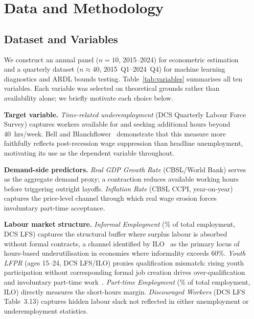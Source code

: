 \documentclass[sigconf]{acmart}
\begin{document}
\section{Data and Methodology}

\subsection{Dataset and Variables}

We construct an annual panel ($n{=}10$, 2015--2024) for econometric
estimation and a quarterly dataset ($n{\approx}40$, 2015~Q1--2024~Q4)
for machine learning diagnostics and ARDL bounds testing.
Table~\ref{tab:variables} summarises all ten variables. Each variable
was selected on theoretical grounds rather than availability alone; we
briefly motivate each choice below.

\textbf{Target variable.} \emph{Time-related underemployment} (DCS
Quarterly Labour Force Survey) captures workers available for and seeking
additional hours beyond 40~hrs/week. Bell and
Blanchflower~\cite{bell2018underemployment} demonstrate that this
measure more faithfully reflects post-recession wage suppression than
headline unemployment, motivating its use as the dependent variable
throughout.

\textbf{Demand-side predictors.} \emph{Real GDP Growth Rate}
(CBSL/World Bank) serves as the aggregate demand proxy; a contraction
reduces available working hours before triggering outright layoffs.
\emph{Inflation Rate} (CBSL CCPI, year-on-year) captures the
price-level channel through which real wage erosion forces
involuntary part-time acceptance.

\textbf{Labour market structure.} \emph{Informal Employment} (\% of
total employment, DCS LFS) captures the structural buffer where
surplus labour is absorbed without formal contracts, a channel
identified by ILO~\cite{ilo2013,iloweso2024} as the primary locus of
hours-based underutilisation in economies where informality exceeds
60\%. \emph{Youth LFPR} (ages 15--24, DCS LFS/ILO) proxies
qualification mismatch: rising youth participation without
corresponding formal job creation drives over-qualification and
involuntary part-time work~\cite{oecd2017}. \emph{Part-time Employment}
(\% of total employment, ILO) directly measures the
short-hours margin. \emph{Discouraged Workers} (DCS LFS Table~3.13)
captures hidden labour slack not reflected in either unemployment or
underemployment statistics.
\end{document}
